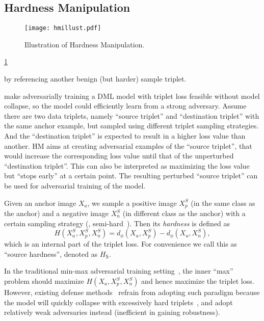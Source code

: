 \documentclass[10pt,twocolumn,letterpaper]{article}
\begin{document}
\subsection{Hardness Manipulation}
\label{sec:31}

\begin{figure}
	\texttt{[image: hmillust.pdf]}
	\caption{Illustration of Hardness Manipulation.}
	\label{fig:hm}
\end{figure}

\cref{fig:hm}

by referencing
another benign (but harder) sample triplet.

make adversarially training a DML model
with triplet loss feasible without model collapse, so the model could
efficiently learn from a strong adversary.
%
Assume there are two data triplets, namely ``source triplet'' and ``destination
triplet'' with the same anchor example, but sampled using different triplet
sampling strategies.
%
And the ``destination triplet'' is expected to result in a higher loss value
than another.
%
HM aims at creating adversarial examples of the ``source triplet'', that would
increase the corresponding loss value until that of the unperturbed
``destination triplet''.
%
This can also be interpreted as maximizing the loss value but ``stops early''
at a certain point.
%
The resulting perturbed ``source triplet'' can be used for adversarial training
of the model.

Given an anchor image $X_a$, we sample a positive image $X_p^S$ (in the same
class as the anchor) and a negative image $X_n^S$ (in different class as the
anchor) with a certain sampling strategy (\eg, semi-hard~\cite{facenet}).
%
%
Then its \emph{hardness} is defined as
%
\begin{equation}
%
H(X_a^S,X_p^S,X_n^S)=d_\phi(X_a,X_p^S)-d_\phi(X_a,X_n^S),
%
\end{equation}
%
which is an internal
part of the triplet loss.
%
For convenience we call this as ``source hardness'', denoted as $H_\mathsf{S}$.

In the traditional min-max adversarial training setting~\cite{madry}, the inner
``max'' problem should maximize $H(X_a,X_p^S,X_n^S)$ and hence maximize the triplet
loss.
%
However, existing defense methods~\cite{advorder,robrank} refrain from adopting
such paradigm because the model will quickly collapse with excessively hard
triplets~\cite{facenet}, and adopt relatively weak adversaries instead
(inefficient in gaining robustness).
\end{document}
